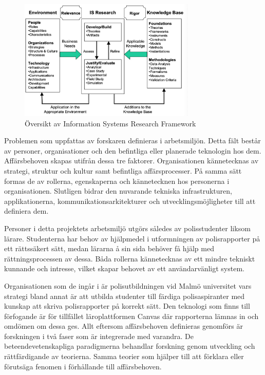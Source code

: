 \documentclass[swedish]{maucsthesis}
\begin{document}
\begin{figure}[H]
    \centering
    \includegraphics[width=0.75\textwidth]{isframework}
    \caption{Översikt av Information Systems Research Framework}
    \label{fig:isframework}
\end{figure}

Problemen som uppfattas av forskaren definieras i arbetsmiljön. Detta fält
består av personer, organisationer och den befintliga eller planerade teknologin
hos dem. Affärsbehoven skapas utifrån dessa tre faktorer. Organisationen
kännetecknas av strategi, struktur och kultur samt befintliga affärsprocesser.
På samma sätt formas de av rollerna, egenskaperna och kännetecknen hos
personerna i organisationen. Slutligen bidrar den nuvarande tekniska
infrastrukturen, applikationerna, kommunikationsarkitekturer och
utvecklingsmöjligheter till att definiera dem.

Personer i detta projektets arbetsmiljö utgörs således av polisstudenter liksom
lärare. Studenterna har behov av hjälpmedel i utformningen av polisrapporter på
ett rättssäkert sätt, medan lärarna å sin sida behöver få hjälp med
rättningsprocessen av dessa. Båda rollerna kännetecknas av ett mindre tekniskt
kunnande och intresse, vilket skapar behovet av ett användarvänligt system.

Organisationen som de ingår i är polisutbildningen vid Malmö universitet vars
strategi bland annat är att utbilda studenter till färdiga polisaspiranter med
kunskap att skriva polisrapporter på korrekt sätt. Den teknologi som finns till
förfogande är för tillfället läroplattformen Canvas där rapporterna lämnas in
och omdömen om dessa ges. Allt eftersom affärsbehoven definieras genomförs är
forskningen i två faser som är integrerade med varandra. De
beteendevetenskapliga paradigmerna behandlar forskning genom utveckling och
rättfärdigande av teorierna. Samma teorier som hjälper till att förklara eller
förutsäga fenomen i förhållande till affärsbehoven.
\end{document}
